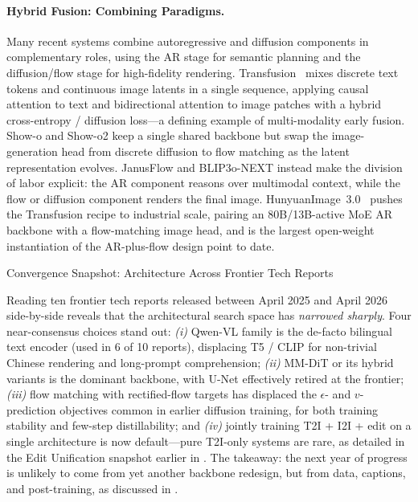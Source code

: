\documentclass{llmxive}
\begin{document}
\paragraph{Hybrid Fusion: Combining Paradigms.}
Many recent systems combine autoregressive and diffusion components in complementary roles, using the AR stage for semantic planning and the diffusion/flow stage for high-fidelity rendering. Transfusion~\citep{zhou2024transfusion} mixes discrete text tokens and continuous image latents in a single sequence, applying causal attention to text and bidirectional attention to image patches with a hybrid cross-entropy / diffusion loss---a defining example of multi-modality early fusion. Show-o and Show-o2 keep a single shared backbone but swap the image-generation head from discrete diffusion to flow matching as the latent representation evolves. JanusFlow and BLIP3o-NEXT instead make the division of labor explicit: the AR component reasons over multimodal context, while the flow or diffusion component renders the final image. HunyuanImage~3.0~\citep{cao2025hunyuanimage} pushes the Transfusion recipe to industrial scale, pairing an 80B/13B-active MoE AR backbone with a flow-matching image head, and is the largest open-weight instantiation of the AR-plus-flow design point to date.


\begin{highlightbox}{Convergence Snapshot: Architecture Across Frontier Tech Reports}

Reading ten frontier tech reports released between April 2025 and April 2026 side-by-side reveals that the architectural search space has \emph{narrowed sharply}. Four near-consensus choices stand out: \emph{(i)} Qwen-VL family is the de-facto bilingual text encoder (used in 6 of 10 reports), displacing T5 / CLIP for non-trivial Chinese rendering and long-prompt comprehension; \emph{(ii)} MM-DiT or its hybrid variants is the dominant backbone, with U-Net effectively retired at the frontier; \emph{(iii)} flow matching with rectified-flow targets has displaced the $\epsilon$- and $v$-prediction objectives common in earlier diffusion training, for both training stability and few-step distillability; and \emph{(iv)} jointly training T2I + I2I + edit on a single architecture is now default---pure T2I-only systems are rare, as detailed in the Edit Unification snapshot earlier in . The takeaway: the next year of progress is unlikely to come from yet another backbone redesign, but from data, captions, and post-training, as discussed in .
\end{highlightbox}
\end{document}
